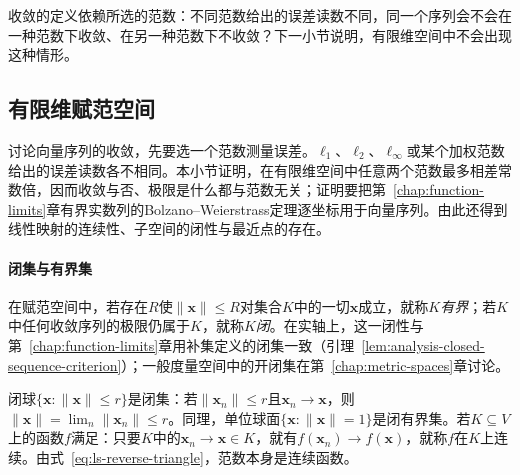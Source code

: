 收敛的定义依赖所选的范数：不同范数给出的误差读数不同，同一个序列会不会在一种范数下收敛、在另一种范数下不收敛？下一小节说明，有限维空间中不会出现这种情形。

\subsection{有限维赋范空间}
\label{sec:ls-finite-dimensional-sequences}
\label{sec:linear-algebra-sequence-convergence}
\label{sec:ls-error-scale-comparison}

讨论向量序列的收敛，先要选一个范数测量误差。$\ell_1$、$\ell_2$、$\ell_\infty$或某个加权范数给出的误差读数各不相同。本小节证明，在有限维空间中任意两个范数最多相差常数倍，因而收敛与否、极限是什么都与范数无关；证明要把第~\ref{chap:function-limits}章有界实数列的Bolzano--Weierstrass定理逐坐标用于向量序列。由此还得到线性映射的连续性、子空间的闭性与最近点的存在。

\paragraph{闭集与有界集}
在赋范空间中，若存在$R$使$\lVert\bm x\rVert\leq R$对集合$K$中的一切$\bm x$成立，就称$K$\emph{有界}；若$K$中任何收敛序列的极限仍属于$K$，就称$K$\emph{闭}。在实轴上，这一闭性与第~\ref{chap:function-limits}章用补集定义的闭集一致（引理~\ref{lem:analysis-closed-sequence-criterion}）；一般度量空间中的开闭集在第~\ref{chap:metric-spaces}章讨论。

闭球$\{\bm x:\lVert\bm x\rVert\leq r\}$是闭集：若$\lVert\bm x_n\rVert\leq r$且$\bm x_n\to\bm x$，则$\lVert\bm x\rVert=\lim_n\lVert\bm x_n\rVert\leq r$。同理，单位球面$\{\bm x:\lVert\bm x\rVert=1\}$是闭有界集。若$K\subseteq V$上的函数$f$满足：只要$K$中的$\bm x_n\to\bm x\in K$，就有$f(\bm x_n)\to f(\bm x)$，就称$f$在$K$上连续。由式~\eqref{eq:ls-reverse-triangle}，范数本身是连续函数。

